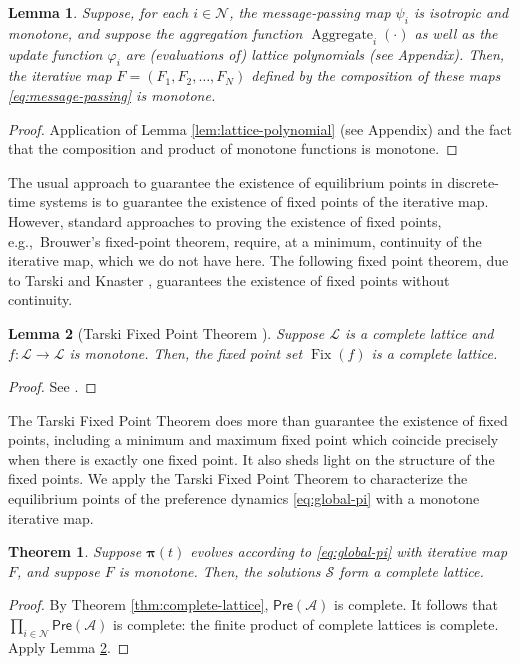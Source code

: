 \documentclass[conference]{ieeeconf}
\newcommand{\N}{\mathcal{N}}
\newcommand{\A}{\mathcal{A}}
\renewcommand{\SS}{\mathcal{S}}
\newcommand{\Pref}{\mathsf{Pre}}
\newcommand{\lattice}{\mathcal{L}}
\newcommand{\profile}{\boldsymbol{\pi}}
\DeclareMathOperator{\Fix}{Fix}
\DeclareMathOperator{\Aggregate}{Aggregate}
\newtheorem{theorem}{Theorem}
\newtheorem{lemma}{Lemma}
\begin{document}
\begin{lemma} \label{lem:message-passing}
    Suppose, for each $i \in \N$, the message-passing map $\psi_i$ is isotropic and monotone, and suppose the aggregation function $\Aggregate_i(\cdot)$ as well as the update function $\varphi_i$ are (evaluations of) lattice polynomials (see Appendix). Then, the iterative map $F = (F_1,F_2,\dots,F_N)$ defined by the composition of these maps \eqref{eq:message-passing} is monotone.
\end{lemma}
\begin{proof}
    Application of Lemma \ref{lem:lattice-polynomial} (see Appendix) and the fact that the composition and product of monotone functions is monotone.
\end{proof}

The usual approach to guarantee the existence of equilibrium points in discrete-time systems is to guarantee the existence of fixed points of the iterative map. However, standard approaches to proving the existence of fixed points, e.g.,~Brouwer's fixed-point theorem, require, at a minimum, continuity of the iterative map, which we do not have here. The following fixed point theorem, due to Tarski \cite{tarski1941} and Knaster \cite{knaster1928}, guarantees the existence of fixed points without continuity.

\begin{lemma}[Tarski Fixed Point Theorem \cite{tarski1955}] \label{lem:tfpt}
    Suppose $\lattice$ is a complete lattice and $f: \lattice \to \lattice$ is monotone. Then, the fixed point set $\Fix(f)$ is a complete lattice.
\end{lemma}
\begin{proof}
    See \cite[Theorem 12.2]{roman2008}. 
\end{proof}

The Tarski Fixed Point Theorem does more than guarantee the existence of fixed points, including a minimum and maximum fixed point which coincide precisely when there is exactly one fixed point. It also sheds light on the structure of the fixed points. We apply the Tarski Fixed Point Theorem to characterize the equilibrium points of the preference dynamics \eqref{eq:global-pi} with a monotone iterative map.

\begin{theorem} \label{thm:dynamics}
    Suppose $\profile(t)$ evolves according to \eqref{eq:global-pi} with iterative map $F$, and suppose $F$ is monotone. Then, the solutions $\SS$ form a complete lattice.
\end{theorem}
\begin{proof}
    By Theorem \ref{thm:complete-lattice}, $\Pref(\A)$ is complete. It follows that $\prod_{i \in \N}  \Pref(\A)$ is complete: the finite product of complete lattices is complete. Apply Lemma \ref{lem:tfpt}.
\end{proof}
\end{document}
